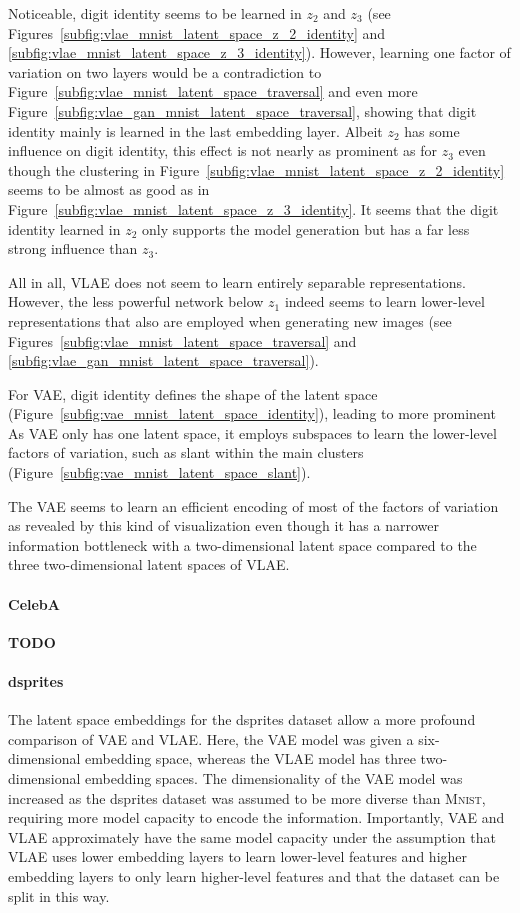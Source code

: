 Noticeable, digit identity seems to be learned in $z_2$ and $z_3$ (see Figures~\ref{subfig:vlae_mnist_latent_space_z_2_identity} and \ref{subfig:vlae_mnist_latent_space_z_3_identity}).
However, learning one factor of variation on two layers would be a contradiction to Figure~\ref{subfig:vlae_mnist_latent_space_traversal} and even more Figure~\ref{subfig:vlae_gan_mnist_latent_space_traversal}, showing that digit identity mainly is learned in the last embedding layer.
Albeit $z_2$ has some influence on digit identity, this effect is not nearly as prominent as for $z_3$ even though the clustering in Figure~\ref{subfig:vlae_mnist_latent_space_z_2_identity} seems to be almost as good as in Figure~\ref{subfig:vlae_mnist_latent_space_z_3_identity}.
It seems that the digit identity learned in $z_2$ only supports the model generation but has a far less strong influence than $z_3$.

All in all, \ac{VLAE} does not seem to learn entirely separable representations.
However, the less powerful network below $z_1$ indeed seems to learn lower-level representations that also are employed when generating new images (see Figures~\ref{subfig:vlae_mnist_latent_space_traversal} and \ref{subfig:vlae_gan_mnist_latent_space_traversal}).

For \ac{VAE}, digit identity defines the shape of the latent space (Figure~\ref{subfig:vae_mnist_latent_space_identity}), leading to more prominent 
As \ac{VAE} only has one latent space, it employs subspaces to learn the lower-level factors of variation, such as slant within the main clusters (Figure~\ref{subfig:vae_mnist_latent_space_slant}).

The \ac{VAE} seems to learn an efficient encoding of most of the factors of variation as revealed by this kind of visualization even though it has a narrower information bottleneck with a two-dimensional latent space compared to the three two-dimensional latent spaces of \ac{VLAE}.

\paragraph{CelebA}
\textbf{TODO}

\paragraph{dsprites}

The latent space embeddings for the dsprites dataset allow a more profound comparison of \ac{VAE} and \ac{VLAE}.
Here, the \ac{VAE} model was given a six-dimensional embedding space, whereas the \ac{VLAE} model has three two-dimensional embedding spaces.
The dimensionality of the \ac{VAE} model was increased as the dsprites dataset was assumed to be more diverse than \textsc{Mnist}, requiring more model capacity to encode the information.
Importantly, \ac{VAE} and \ac{VLAE} approximately have the same model capacity under the assumption that \ac{VLAE} uses lower embedding layers to learn lower-level features and higher embedding layers to only learn higher-level features and that the dataset can be split in this way.


